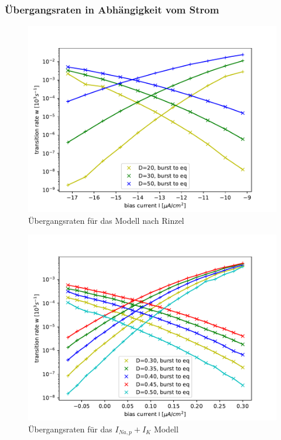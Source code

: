 \documentclass[12pt,a4paper]{article}
\begin{document}
\subsubsection{Übergangsraten in Abhängigkeit vom Strom}
\begin{figure}[H]
	\centering
	\includegraphics[scale=1]{tranrates.pdf}\caption{Übergangsraten für das Modell nach Rinzel}
	\label{tranraterinzel}
\end{figure}
\begin{figure}[H]
	\centering
	\includegraphics[scale=1]{tranratesneur.pdf}\caption{Übergangsraten für das $I_{Na,p}+I_K$ Modell}
	\label{tranrateneur}
\end{figure}
\end{document}
